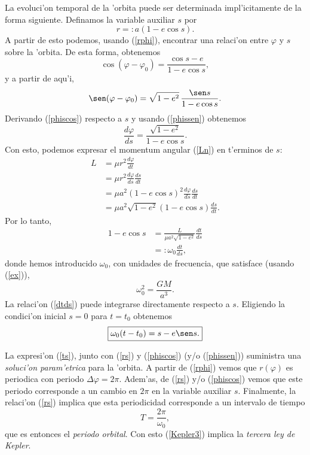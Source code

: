 La evoluci'on temporal de la 'orbita puede ser determinada impl'icitamente de la forma siguiente. Definamos la variable auxiliar $s$ por
\begin{equation}\label{rs}
\boxed{r=:a(1-e\cos s).}
\end{equation}
A partir de esto podemos, usando (\ref{rphi}), encontrar una relaci'on entre $\varphi$ y $s$ sobre la 'orbita. De esta forma, obtenemos
\begin{equation}\label{phiscos}
\boxed{\cos(\varphi-\varphi_0)=\frac{\cos s -e}{1-e\cos s}, }
\end{equation}
y a partir de aqu'i,
\begin{equation}\label{phissen}
\sen(\varphi-\varphi_0)=\sqrt{1-e^2}\,\frac{\sen s}{1-e\cos s}.
\end{equation}
Derivando (\ref{phiscos}) respecto a $s$ y usando (\ref{phissen}) obtenemos
\begin{equation}
\frac{d\varphi}{ds}=\frac{\sqrt{1-e^2}}{1-e\cos s}.
\end{equation}
Con esto, podemos expresar el momentum angular (\ref{Ln}) en t'erminos de $s$:
\begin{align}
L & = \mu r^2 \frac{d\varphi}{dt} \\
& = \mu r^2 \frac{d\varphi}{ds}\frac{ds}{dt} \\
& = \mu a^2\left(1-e\cos s\right)^2 \frac{d\varphi}{ds}\frac{ds}{dt} \\
& = \mu a^2\sqrt{1-e^2}\left(1-e\cos s\right) \frac{ds}{dt} .
\end{align}
Por lo tanto,
\begin{align}
1-e\cos s & = \frac{L}{\mu a^2\sqrt{1-e^2}} \frac{dt}{ds} \\
& =: \omega_0 \frac{dt}{ds}, \label{dtds}
\end{align}
donde hemos introducido $\omega_0$, con unidades de frecuencia, que satisface (usando (\ref{ex})),
\begin{equation}\label{Kepler3}
\boxed{\omega_0^2=\frac{GM}{a^3}.}
\end{equation}
La relaci'on (\ref{dtds}) puede integrarse directamente respecto a $s$. Eligiendo la condici'on inicial $s=0$ para $t=t_0$ obtenemos
\begin{equation}\label{ts}
\boxed{\omega_0(t-t_0)=s-e\sen s.}
\end{equation}

La expresi'on (\ref{ts}), junto con (\ref{rs}) y (\ref{phiscos}) (y/o (\ref{phissen})) suministra una \textit{soluci'on param'etrica} para la 'orbita.
A partir de (\ref{rphi}) vemos que $r(\varphi)$ es periodica con periodo $\Delta\varphi=2\pi$. Adem'as, de (\ref{rs}) y/o (\ref{phiscos}) vemos que este periodo corresponde a un cambio en $2\pi$ en la variable auxiliar $s$. Finalmente, la relaci'on (\ref{rs}) implica que esta periodicidad corresponde a un intervalo de tiempo
\begin{equation}
T=\frac{2\pi}{\omega_0},
\end{equation}
que es entonces el \textit{periodo orbital}. Con esto (\ref{Kepler3}) implica la \textit{tercera ley de Kepler}.